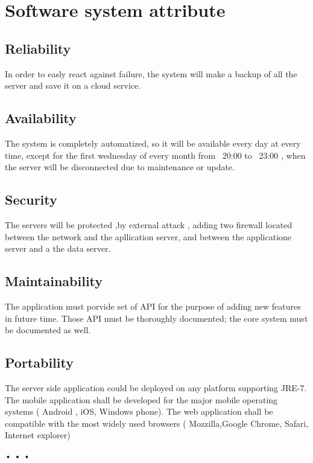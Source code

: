\section{Software system attribute}
  \subsection{Reliability}
  In order to easly react against failure, the system will make a backup of all the server and save it on a cloud service.
  \subsection{Availability}
  The system is completely automatized, so it will be available every day at every time, except for the first wednesday of every month from ~20:00 to ~23:00 , when the server will be disconnected due to maintenance or update.
  \subsection{Security}
  The servers will be protected ,by external attack , adding two firewall located between the network and the apllication server, and between the applicatione server and a the data server.
  \subsection{Maintainability}
  The application must porvide set of API for the purpose of adding new features in future time.
  Those API must be thoroughly documented; the core system must be documented as well.
  \subsection{Portability}
  The server side application could be deployed on any platform supporting JRE-7.\\
  The mobile application shall be developed for the major mobile operating systems ( Android , iOS, Windows phone).
  The web application shall be compatible with the most widely used browsers ( Mozzilla,Google Chrome, Safari, Internet explorer) %
  
 • • •
                                                                                                                                                                                                                                                                                                                                                                                                                                                                                                                                                                                                                                                                                                                                                                                                                                                                                                                                                                                                                                                                                                                  
